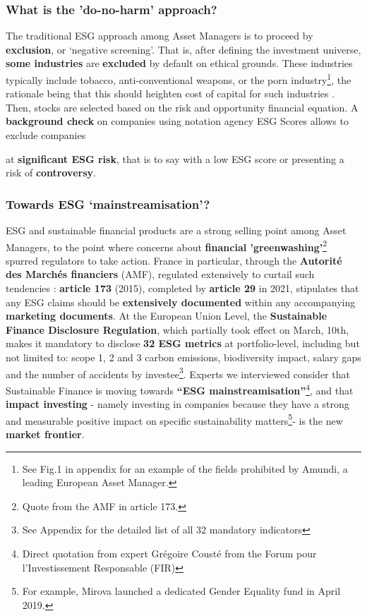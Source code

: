 \documentclass[12pt]{report}
\begin{document}
\subsubsection{What is the 'do-no-harm' approach?}
The traditional ESG approach among Asset Managers is to proceed by \textbf{exclusion}, or ‘negative screening’. That is, after defining the investment universe, \textbf{some industries} are \textbf{excluded} by default on ethical grounds. These industries typically include tobacco, anti-conventional weapons, or the porn industry\footnote{See Fig.1 in appendix for an example of the fields prohibited by Amundi, a leading European Asset Manager.}, the rationale being that this should heighten cost of capital for such industries \citep{costofcapital}.
Then, stocks are selected based on the risk and opportunity financial equation. A \textbf{background check} on companies using notation agency ESG Scores allows to exclude companies {at \textbf{significant ESG risk}, that is to say with a low ESG score or presenting a risk of \textbf{controversy}.

\subsubsection{Towards ESG ‘mainstreamisation’?}
ESG and sustainable financial products are a strong selling point among Asset Managers, to the point where concerns about \textbf{financial 'greenwashing’}\footnote{Quote from the AMF in article 173.} spurred regulators to take action. France in particular, through the \textbf{Autorité des Marchés financiers} (AMF), regulated extensively to curtail such tendencies : \textbf{article 173} (2015), completed by \textbf{article 29} in 2021, stipulates that any ESG claims should be \textbf{extensively documented} within any accompanying \textbf{marketing documents}. At the European Union Level, the \textbf{Sustainable Finance Disclosure Regulation}, which partially took effect on March, 10th, makes it mandatory to disclose \textbf{32 ESG metrics} at portfolio-level, including but not limited to: scope 1, 2 and 3 carbon emissions, biodiversity impact, salary gaps and the number of accidents by investee\footnote{See Appendix for the detailed list of all 32 mandatory indicators}.
Experts we interviewed consider that Sustainable Finance is moving towards \textbf{“ESG mainstreamisation”}\footnote{Direct quotation from expert Grégoire Cousté from the Forum pour l’Investissement Responsable (FIR)}, and that \textbf{impact investing} - namely investing in companies because they have a strong and measurable positive impact on specific sustainability matters\footnote{For example, Mirova launched a dedicated Gender Equality fund in April 2019.}- is the new \textbf{market frontier}. 

}
\end{document}
